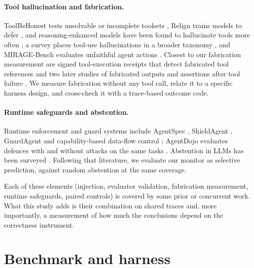 \documentclass[pdflatex,sn-mathphys-num,Numbered]{sn-jnl}
\begin{document}
\paragraph{Tool hallucination and fabrication.} ToolBeHonest tests unsolvable or incomplete toolsets \cite{zhang2024toolbehonest}, Relign trains models to defer \cite{xu2025relign}, and reasoning-enhanced models have been found to hallucinate tools more often \cite{yin2026reasoningtrap}; a survey places tool-use hallucinations in a broader taxonomy \cite{lin2025agenthallucsurvey}, and MIRAGE-Bench evaluates unfaithful agent actions \cite{zhang2025miragebench}. Closest to our fabrication measurement are signed tool-execution receipts that detect fabricated tool references \cite{basu2026toolreceipts} and two later studies of fabricated outputs and assertions after tool failure \cite{soni2026toolfailbench,sethi2026fabrication}. We measure fabrication without any tool call, relate it to a specific harness design, and cross-check it with a trace-based outcome code.

\paragraph{Runtime safeguards and abstention.} Runtime enforcement and guard systems include AgentSpec \cite{wang2026agentspec}, ShieldAgent \cite{chen2025shieldagent}, GuardAgent \cite{xiang2025guardagent} and capability-based data-flow control \cite{debenedetti2026camel}; AgentDojo evaluates defences with and without attacks on the same tasks \cite{debenedetti2024agentdojo}. Abstention in LLMs has been surveyed \cite{wen2025knowyourlimits}. Following that literature, we evaluate our monitor as selective prediction, against random abstention at the same coverage.

Each of these elements (injection, evaluator validation, fabrication measurement, runtime safeguards, paired controls) is covered by some prior or concurrent work. What this study adds is their combination on shared traces and, more importantly, a measurement of how much the conclusions depend on the correctness instrument.

\section{Benchmark and harness}\label{sec:benchmark}
\end{document}
